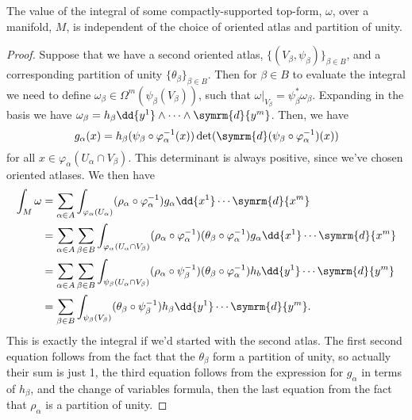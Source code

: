 \documentclass[fleqn]{NotesClass}
\renewcommand{\dl}{\symrm{d}}
\begin{document}
    \begin{prp}{}{}
        The value of the integral of some compactly-supported top-form, \(\omega\), over a manifold, \(M\), is independent of the choice of oriented atlas and partition of unity.
        \begin{proof}
            Suppose that we have a second oriented atlas, \(\{(V_\beta, \psi_\beta)\}_{\beta \in B}\), and a corresponding partition of unity \(\{\theta_\beta\}_{\beta \in B}\).
            Then for \(\beta \in B\) to evaluate the integral we need to define \(\omega_\beta \in \Omega^m(\psi_\beta(V_\beta))\), such that \(\omega|_{V_\beta} = \psi_\beta^* \omega_\beta\).
            Expanding in the basis we have \(\omega_\beta = h_\beta \dd{y^1} \wedge \dotsb \wedge \dl{y^m}\).
            Then, we have
            \begin{equation}
                g_\alpha(x) = h_\beta(\psi_\beta \circ \varphi_\alpha^{-1}(x)) \det(\dl(\psi_\beta \circ \varphi_\alpha^{-1})(x))
            \end{equation}
            for all \(x \in \varphi_\alpha(U_\alpha \cap V_\beta)\).
            This determinant is always positive, since we've chosen oriented atlases.
            We then have
            \begin{align}
                \int_M \omega &= \sum_{\alpha \in A} \int_{\varphi_\alpha(U_\alpha)} (\rho_\alpha \circ \varphi_\alpha^{-1}) g_\alpha \dd{x^1} \dotsm \dl{x^m}\\
                &= \sum_{\alpha \in A} \sum_{\beta \in B} \int_{\varphi_\alpha(U_\alpha \cap V_\beta)} (\rho_\alpha \circ \varphi_\alpha^{-1})(\theta_\beta \circ \varphi_\alpha^{-1})g_\alpha \dd{x^1} \dotsm \dl{x^m}\\
                &= \sum_{\alpha \in A} \sum_{\beta \in B} \int_{\psi_\beta(U_\alpha \cap V_\beta)} (\rho_\alpha \circ \psi_\beta^{-1})(\theta_\beta \circ \varphi_\alpha^{-1})h_b \dd{y^1} \dotsm \dl{y^m}\\
                &= \sum_{\beta \in B} \int_{\psi_\beta(V_\beta)} (\theta_\beta \circ \psi_\beta^{-1}) h_\beta \dd{y^1} \dotsm \dl{y^m}.
            \end{align}
            This is exactly the integral if we'd started with the second atlas.
            The first second equation follows from the fact that the \(\theta_\beta\) form a partition of unity, so actually their sum is just 1, the third equation follows from the expression for \(g_\alpha\) in terms of \(h_\beta\), and the change of variables formula, then the last equation from the fact that \(\rho_\alpha\) is a partition of unity.
        \end{proof}
    \end{prp}
    
\end{document}
